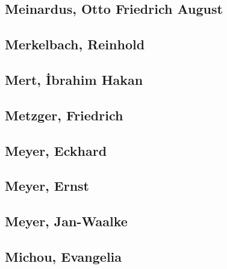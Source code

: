\subsection[Meinardus, Otto Friedrich August (1)]{Meinardus, Otto Friedrich August}

\subsection[Merkelbach, Reinhold (3)]{Merkelbach, Reinhold}



\subsection[Mert, İbrahim Hakan (1)]{Mert, İbrahim Hakan}

\subsection[Metzger, Friedrich (1)]{Metzger, Friedrich}

\subsection[Meyer, Eckhard (1)]{Meyer, Eckhard}

\subsection[Meyer, Ernst (1)]{Meyer, Ernst}

\subsection[Meyer, Jan-Waalke (1)]{Meyer, Jan-Waalke}

\subsection[Michou, Evangelia (1)]{Michou, Evangelia}

